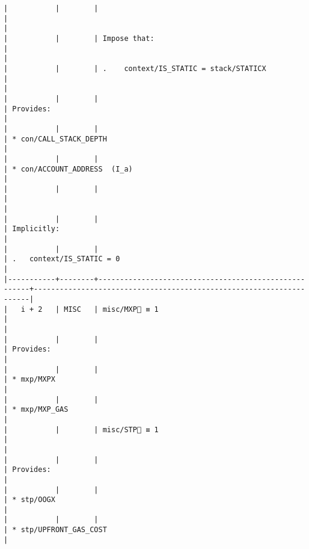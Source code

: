 \documentclass[varwidth=\maxdimen,margin=0.5cm,multi={verbatim}]{standalone}
\begin{document}
\begin{verbatim}
|           |        |                                                      |                                                                     |
|           |        | Impose that:                                         |                                                                     |
|           |        | .    context/IS_STATIC = stack/STATICX               |                                                                     |
|           |        |                                                      | Provides:                                                           |
|           |        |                                                      | * con/CALL_STACK_DEPTH                                              |
|           |        |                                                      | * con/ACCOUNT_ADDRESS  (I_a)                                        |
|           |        |                                                      |                                                                     |
|           |        |                                                      | Implicitly:                                                         |
|           |        |                                                      | .   context/IS_STATIC = 0                                           |
|-----------+--------+------------------------------------------------------+---------------------------------------------------------------------|
|   i + 2   | MISC   | misc/MXP🚩 ≡ 1                                       |                                                                     |
|           |        |                                                      | Provides:                                                           |
|           |        |                                                      | * mxp/MXPX                                                          |
|           |        |                                                      | * mxp/MXP_GAS                                                       |
|           |        | misc/STP🚩 ≡ 1                                       |                                                                     |
|           |        |                                                      | Provides:                                                           |
|           |        |                                                      | * stp/OOGX                                                          |
|           |        |                                                      | * stp/UPFRONT_GAS_COST                                              |

\end{verbatim}
\end{document}
